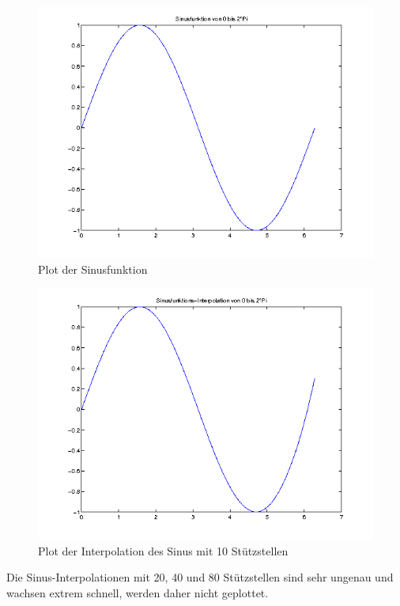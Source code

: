 \documentclass[11pt,a4paper,ngerman]{article}
\begin{document}
\begin{description}
\begin{figure}[h!]
\caption{Plot der Sinusfunktion}
\includegraphics[width=\textwidth]{plotsin.png}
\end{figure}

\begin{figure}[h!]
\caption{Plot der Interpolation des Sinus mit 10 Stützstellen}
\includegraphics[width=\textwidth]{plotsininterpol.png}
\end{figure}

Die Sinus-Interpolationen mit 20, 40 und 80 Stützstellen sind sehr ungenau und wachsen extrem schnell, werden daher nicht geplottet.

\end{description}

\label{LastPage}
\end{document}
